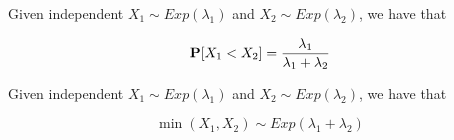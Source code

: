 \begin{theorem}
\label{thm:Exponential-Precedency}
	Given independent $X_{1} \sim Exp(\lambda_{1})$ and $X_{2} \sim Exp(\lambda_{2})$, we have that
	
	\begin{equation}
	\label{eqn:Exponential-Precedency}
	\probability{X_{1} < X_{2}} = \frac{\lambda_{1}}{\lambda_{1} + \lambda_{2}}
	\end{equation}
\end{theorem}

\begin{theorem}
\label{thm:Exponential-Minimum}
	Given independent $X_{1} \sim Exp(\lambda_{1})$ and $X_{2} \sim Exp(\lambda_{2})$, we have that
	
	\begin{equation}
	\label{eqn:Exponential-Minimum}
	\min(X_{1},X_{2}) \sim Exp(\lambda_{1} + \lambda_{2})
	\end{equation}
\end{theorem}